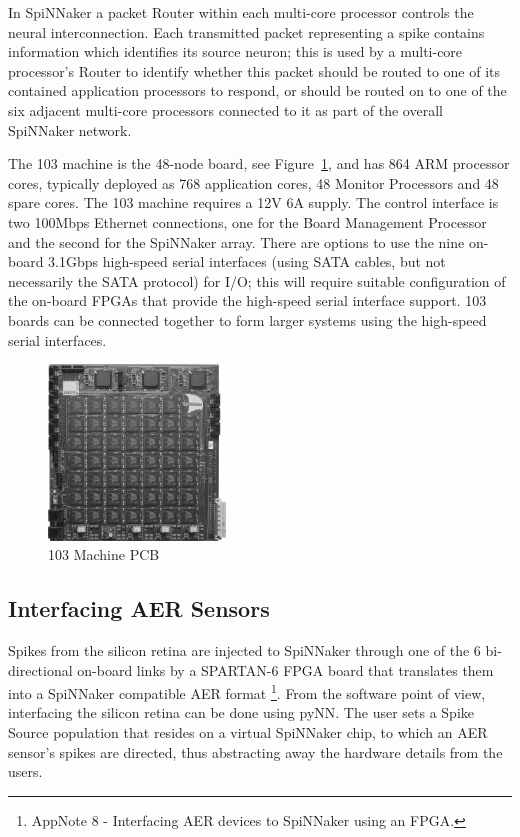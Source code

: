 \documentclass[journal]{journal}
\begin{document}
In SpiNNaker a packet Router within each multi-core processor controls the neural interconnection. 
Each transmitted packet representing a spike contains information which identifies its source neuron; 
this is used by a multi-core processor's Router to identify whether this packet should be routed to one of its contained application processors to respond, or should be routed on to one of the six adjacent multi-core processors connected to it as part of the overall SpiNNaker network.

The 103 machine is the 48-node board, see Figure~\ref{fig:48node}, and has 864 ARM processor cores, typically deployed as 768 application cores, 48 Monitor Processors and 48 spare cores. The 103 machine requires a 12V 6A supply. 
The control interface is two 100Mbps Ethernet connections, one for the Board Management Processor and the second for the SpiNNaker array. 
There are options to use the nine on-board 3.1Gbps high-speed serial interfaces (using SATA cables, but not necessarily the SATA protocol) for I/O; 
this will require suitable configuration of the on-board FPGAs that provide the high-speed serial interface support. 
103 boards can be connected together to form larger systems using the high-speed serial interfaces. 

\begin{figure}
\centering
	\includegraphics[width=0.42\textwidth]{pics/SpiNN5.pdf}
	\caption{103 Machine PCB}
	\label{fig:48node}
\end{figure}

\subsection{Interfacing AER Sensors}
Spikes from the silicon retina are injected to SpiNNaker through one of the 6 bi-directional on-board links by a SPARTAN-6 FPGA board that translates them into a SpiNNaker compatible AER format \footnote{AppNote 8 - Interfacing AER devices to SpiNNaker using an FPGA.}. 
From the software point of view, interfacing the silicon retina can be done using pyNN. 
The user sets a Spike Source population that resides on a virtual SpiNNaker chip, to which an AER sensor's spikes are directed, thus abstracting away the hardware details from the users\cite{galluppi2012real}.
\end{document}
